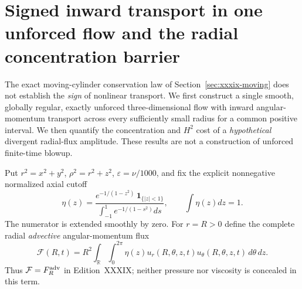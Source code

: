 
\section{Signed inward transport in one unforced flow and the radial concentration barrier}
\label{sec:xl-inward-concentration}
The exact moving-cylinder conservation law of Section~\ref{sec:xxxix-moving}
does not establish the \emph{sign} of nonlinear transport. We first
construct a single smooth, globally regular, exactly unforced
three-dimensional flow with inward angular-momentum transport across
every sufficiently small radius for a common positive interval.
We then quantify the concentration and $H^2$ cost of a \emph{hypothetical}
divergent radial-flux amplitude. These results are not a construction
of unforced finite-time blowup.

Put $r^2=x^2+y^2$, $\rho^2=r^2+z^2$, $\varepsilon=\nu/1000$,
and fix the explicit nonnegative normalized axial cutoff
\[
\eta(z)=
\frac{e^{-1/(1-z^2)}\,\mathbf1_{\{|z|<1\}}}
{\int_{-1}^{1}e^{-1/(1-s^2)}ds},\qquad\int\eta(z)dz=1.
\]
The numerator is extended smoothly by zero.
For $r=R>0$ define the complete radial \emph{advective}
angular-momentum flux
\[
\mathcal F(R,t)=R^2\int_{\mathbb R}\int_0^{2\pi}
\eta(z)u_r(R,\theta,z,t)u_\theta(R,\theta,z,t)
\,d\theta\,dz.
\]
Thus $\mathcal F=F_R^{\rm adv}$ in Edition~XXXIX; neither
pressure nor viscosity is concealed in this term.

